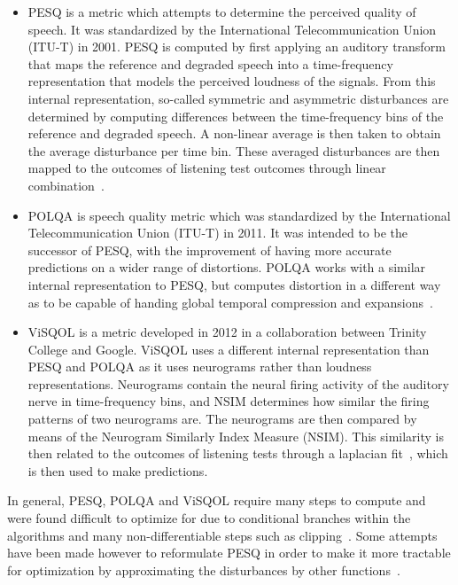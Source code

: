 \begin{itemize}
    \item 
    PESQ is a metric which attempts to determine the perceived quality of speech.
    It was standardized by the International Telecommunication Union (ITU-T) in 2001.
    PESQ is computed by first applying an auditory transform that maps the reference and degraded speech into a 
    time-frequency representation that models the perceived loudness of the signals.
    From this internal representation, so-called symmetric and asymmetric disturbances are determined 
    by computing differences between the time-frequency bins of the reference and degraded speech. 
    A non-linear average is then taken to obtain the average disturbance per time bin.
    These averaged disturbances are then mapped to the outcomes of listening test outcomes through linear 
    combination~\cite{rix2001perceptual}.

    \item
    POLQA is speech quality metric which was standardized by the International Telecommunication Union (ITU-T) in 2011. 
    It was intended to be the successor of PESQ, with the improvement of having more accurate predictions on a 
    wider range of distortions.
    POLQA works with a similar internal representation to PESQ, but computes distortion in a different way 
    as to be capable of handing global temporal compression and expansions~\cite{beerends2013perceptual}.

    \item
    ViSQOL is a metric developed in 2012 in a collaboration between Trinity College and Google.
    ViSQOL uses a different internal representation than PESQ and POLQA as it uses neurograms rather than loudness representations. 
    Neurograms contain the neural firing activity of the auditory nerve in time-frequency bins, and NSIM determines how similar
    the firing patterns of two neurograms are.
    The neurograms are then compared by means of the Neurogram Similarly Index Measure (NSIM).
    This similarity is then related to the outcomes of listening tests through a laplacian fit~\cite{hines2012visqol}, which is then used to make predictions.
\end{itemize}
In general, PESQ, POLQA and ViSQOL require many steps to compute and were found difficult to optimize for due to 
conditional branches within the algorithms and many non-differentiable steps such as clipping~\cite{rix2001perceptual,beerends2013perceptual,hines2012visqol}. 
Some attempts have been made however to reformulate PESQ in order to make it more tractable for optimization 
by approximating the disturbances by other functions~\cite{kim2019end}.

